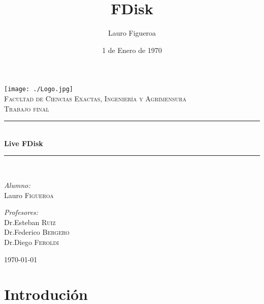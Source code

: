 \documentclass[10pt,oneside,a4paper]{article}
\title{FDisk}
\author{Lauro Figueroa}
\date{1 de Enero de 1970}
\newcommand{\HRule}{\rule{\linewidth}{0.5mm}}
\begin{document}
 
\begin{titlepage}
\begin{center}

\texttt{[image: ./Logo.jpg]}~\\[1cm]

\textsc{\LARGE Facultad de Ciencias Exactas, Ingeniería y Agrimensura}\\[1.5cm]

\textsc{\Large Trabajo final}\\[0.5cm]

\HRule \\[0.4cm]
{ \huge \bfseries Live FDisk \\[0.4cm] }

\HRule \\[1.5cm]

\noindent
\begin{minipage}{0.4\textwidth}
\begin{flushleft} \large
\emph{Alumno:}\\
Lauro \textsc{Figueroa}
\end{flushleft}
\end{minipage}%
\begin{minipage}{0.4\textwidth}
\begin{flushright} \large
\emph{Profesores:} \\
Dr.Esteban \textsc{Ruiz}\\
Dr.Federico \textsc{Bergero}\\
Dr.Diego \textsc{Feroldi}
\end{flushright}
\end{minipage}

\vfill

{\large \today}

\end{center}
\end{titlepage}

\newpage 

\section*{Introdución}
\end{document}
